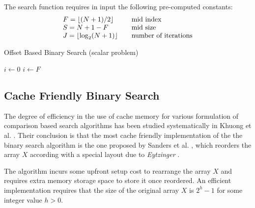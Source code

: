 \documentclass[preprint,1p,times]{elsarticle}
\begin{document}
The search function requires in input the following pre-computed constants:
$$
	\begin{array}{lll}
		F=\left \lfloor (N+1)/2 \right \rfloor & & \text{mid index}  \\
		S=N+1-F  & & \text{mid size} \\
		J=\left \lfloor \log_2(N+1) \right \rfloor & & \text{number of iterations}
	\end{array}
$$

\begin{algorithm}[ht]
	\caption{Offset Based Binary Search  (scalar problem)}
	\label{alg:naiveoffset}
	\begin{algorithmic}
		
		\State $i \leftarrow 0$
		  
			\State $i \leftarrow F$ 
		\EndIf
			 
			  
			\EndIf
		\EndWhile
		\EndFunction
	\end{algorithmic}
\end{algorithm}

\subsection{Cache Friendly Binary Search}
\label{sec:eytzinger}
The degree of efficiency in the use of cache memory for various formulation of comparison based search algorithms has been studied systematically in Khuong et al. \cite{Morin2015}. Their conclusion is that the most cache friendly implementation of the the binary search algorithm is the one proposed by Sanders et al. \cite{Sanders2004}, which reorders the array $X$ according with a special layout due to \textit{Eytzinger} \cite{Eytzinger1590}.

The algorithm incurs some upfront setup cost to rearrange the array $X$ and requires extra memory storage space to store it once reordered. An efficient implementation requires that the size of the original array $X$ is $2^h-1$ for some integer value $h>0$. 
\end{document}
